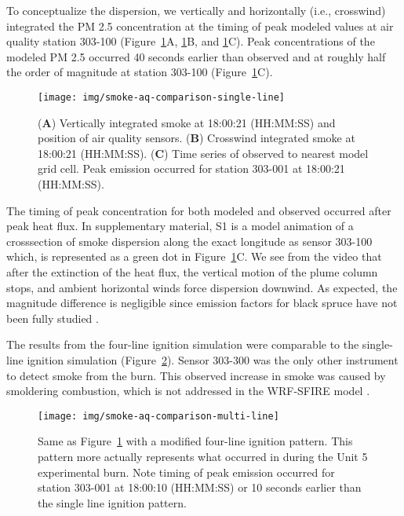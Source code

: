 \documentclass[preprints,article,accept,moreauthors,pdftex]{Definitions/mdpi}
\begin{document}
To conceptualize the dispersion, we vertically and horizontally (i.e., crosswind) integrated the PM 2.5 concentration at the timing of peak modeled values at air quality station 303-100 (Figure~\ref{fig4}A, \ref{fig4}B, and \ref{fig4}C). Peak concentrations of the modeled PM 2.5 occurred 40 seconds earlier than observed and at roughly half the order of magnitude at station 303-100 (Figure~\ref{fig4}C).

\begin{figure}[H]
\centering
 \texttt{[image: img/smoke-aq-comparison-single-line]}
 \caption{(\textbf{A}) Vertically integrated smoke at 18:00:21 (HH:MM:SS) and position of air quality sensors. (\textbf{B}) Crosswind integrated smoke at 18:00:21 (HH:MM:SS). (\textbf{C}) Time series of observed to nearest model grid cell. Peak emission occurred for station 303-001 at 18:00:21 (HH:MM:SS).\label{fig4}}
 \end{figure}

The timing of peak concentration for both modeled and observed occurred after peak heat flux. In supplementary material, S1 is a model animation of a crosssection of smoke dispersion along the exact longitude as sensor 303-100 which, is represented as a green dot in Figure~\ref{fig4}C. We see from the video that after the extinction of the heat flux, the vertical motion of the plume column stops, and ambient horizontal winds force dispersion downwind. As expected, the magnitude difference is negligible since emission factors for black spruce have not been fully studied \cite{prichard_wildland_2020}.

The results from the four-line ignition simulation were comparable to the single-line ignition simulation (Figure~\ref{fig5}). Sensor 303-300 was the only other instrument to detect smoke from the burn. This observed increase in smoke was caused by smoldering combustion, which is not addressed in the WRF-SFIRE model \cite{mallia_incorporating_2020,mandel_coupled_2011,mandel_recent_2014}.

\begin{figure}[H]
\centering
 \texttt{[image: img/smoke-aq-comparison-multi-line]}
 \caption{Same as Figure~\ref{fig4} with a modified four-line ignition pattern. This pattern more actually represents what occurred in during the Unit 5 experimental burn. Note timing of peak emission occurred for station 303-001 at 18:00:10 (HH:MM:SS) or 10 seconds earlier than the single line ignition pattern.\label{fig5}}
 \end{figure}
\end{document}
